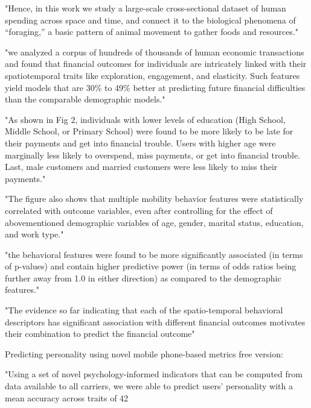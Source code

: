 "Hence, in this work we study a large-scale cross-sectional dataset of human spending across space and time, and connect it to the biological phenomena of “foraging,” a basic pattern of animal movement to gather foods and resources."

"we analyzed a corpus of hundreds of thousands of human economic transactions and found that financial outcomes for individuals are intricately linked with their spatiotemporal traits like exploration, engagement, and elasticity. Such features yield models that are 30\% to 49\% better at predicting future financial difficulties than the comparable demographic models."

"As shown in Fig 2, individuals with lower levels of education (High School, Middle School, or Primary School) were found to be more likely to be late for their payments and get into financial trouble. Users with higher age were marginally less likely to overspend, miss payments, or get into financial trouble. Last, male customers and married customers were less likely to miss their payments."

"The figure also shows that multiple mobility behavior features were statistically correlated with outcome variables, even after controlling for the effect of abovementioned demographic variables of age, gender, marital status, education, and work type."

"the behavioral features were found to be more significantly associated (in terms of p-values) and contain higher predictive power (in terms of odds ratios being further away from 1.0 in either direction) as compared to the demographic features."

"The evidence so far indicating that each of the spatio-temporal behavioral descriptors has significant association with different financial outcomes motivates their combination to predict the financial outcome"




Predicting personality using novel mobile phone-based metrics
free version:

"Using a set of novel psychology-informed indicators that can be computed from data available to all carriers, we were able to predict users’ personality with a mean accuracy across traits of 42%

